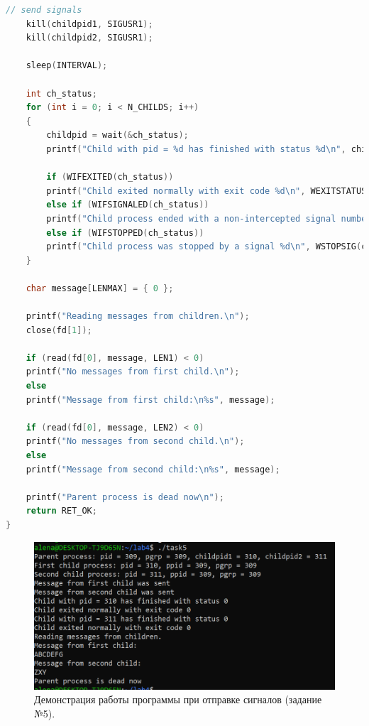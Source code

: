 \documentclass[12pt]{report}
\begin{document}
\begin{lstlisting}[label=some-code,caption=Код программы к заданию №5,language=C]
	// send signals
	kill(childpid1, SIGUSR1);
	kill(childpid2, SIGUSR1);
	
	sleep(INTERVAL);
	
	int ch_status;
	for (int i = 0; i < N_CHILDS; i++)
	{
		childpid = wait(&ch_status);
		printf("Child with pid = %d has finished with status %d\n", childpid, ch_status);
		
		if (WIFEXITED(ch_status))
		printf("Child exited normally with exit code %d\n", WEXITSTATUS(ch_status));
		else if (WIFSIGNALED(ch_status))
		printf("Child process ended with a non-intercepted signal number %d\n", WTERMSIG(ch_status));
		else if (WIFSTOPPED(ch_status))
		printf("Child process was stopped by a signal %d\n", WSTOPSIG(ch_status));
	}
	
	char message[LENMAX] = { 0 };
	
	printf("Reading messages from children.\n");
	close(fd[1]);
	
	if (read(fd[0], message, LEN1) < 0)
	printf("No messages from first child.\n");
	else
	printf("Message from first child:\n%s", message);
	
	if (read(fd[0], message, LEN2) < 0)
	printf("No messages from second child.\n");
	else
	printf("Message from second child:\n%s", message);
	
	printf("Parent process is dead now\n");
	return RET_OK;
}
\end{lstlisting}

\begin{figure}[H]

	\centering

	\includegraphics[width=\linewidth]{img/task05_01.png}
	\caption{Демонстрация работы программы при отправке сигналов (задание №5).}

	\label{fig:task05_01}

\end{figure}
\end{document}
